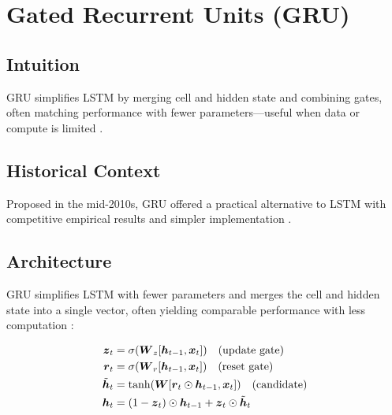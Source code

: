 
\section{Gated Recurrent Units (GRU) }
\label{sec:gru}

\subsection*{Intuition}

GRU simplifies LSTM by merging cell and hidden state and combining gates, often matching performance with fewer parameters—useful when data or compute is limited \cite{Cho2014,GoodfellowEtAl2016}.

\subsection*{Historical Context}

Proposed in the mid-2010s, GRU offered a practical alternative to LSTM with competitive empirical results and simpler implementation \cite{Cho2014}.


\subsection{Architecture}

GRU simplifies LSTM with fewer parameters and merges the cell and hidden state into a single vector, often yielding comparable performance with less computation \cite{Cho2014,GoodfellowEtAl2016}:

\begin{align}
\boldsymbol{z}_t &= \sigma(\boldsymbol{W}_z [\boldsymbol{h}_{t-1}, \boldsymbol{x}_t]) \quad \text{(update gate)} \\
\boldsymbol{r}_t &= \sigma(\boldsymbol{W}_r [\boldsymbol{h}_{t-1}, \boldsymbol{x}_t]) \quad \text{(reset gate)} \\
\tilde{\boldsymbol{h}}_t &= \tanh(\boldsymbol{W} [\boldsymbol{r}_t \odot \boldsymbol{h}_{t-1}, \boldsymbol{x}_t]) \quad \text{(candidate)} \\
\boldsymbol{h}_t &= (1 - \boldsymbol{z}_t) \odot \boldsymbol{h}_{t-1} + \boldsymbol{z}_t \odot \tilde{\boldsymbol{h}}_t
\end{align}

